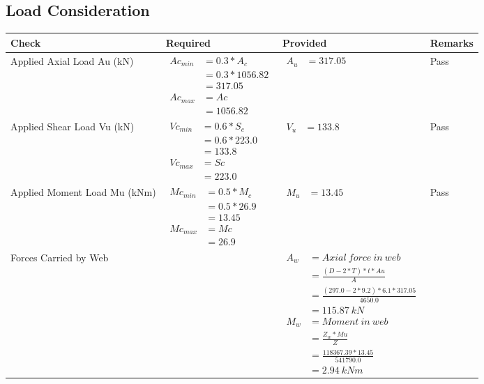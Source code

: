 \documentclass{article}%
\begin{document}
\subsection{Load Consideration}%
\label{subsec:LoadConsideration}%
\renewcommand{\arraystretch}{1.2}%
\begin{longtable}{|p{4cm}|p{3.5cm}|p{6.5cm}|p{1.5cm}|}%
\hline%
\rowcolor{OsdagGreen}%
Check&Required&Provided&Remarks\\%
\hline%
\endhead%
\hline%
Applied Axial Load Au (kN)&$\begin{aligned} Ac_{min} &= 0.3 * A_c\\ &= 0.3 *1056.82\\ &=317.05\\ Ac_{max} &= Ac \\ &=1056.82\end{aligned}$&$\begin{aligned} A_u &=317.05\end{aligned}$&Pass\\%
\hline%
Applied Shear Load Vu (kN)&$\begin{aligned} Vc_{min} &= 0.6 * S_c\\ &= 0.6 *223.0\\ &=133.8\\ Vc_{max} &= Sc \\ &=223.0\end{aligned}$&$\begin{aligned} V_u &=133.8\end{aligned}$&Pass\\%
\hline%
Applied Moment Load Mu (kNm)&$\begin{aligned} Mc_{min} &= 0.5 * M_c\\ &= 0.5 *26.9\\ &=13.45\\  Mc_{max} &= Mc \\ &=26.9\end{aligned}$&$\begin{aligned} M_u &=13.45\end{aligned}$&Pass\\%
\hline%
Forces Carried by Web&&$\begin{aligned}A_w &= Axial~ force~ in~ web  \\   &= \frac{(D- 2*T)*t* Au }{A} \\ &= \frac{(297.0- 2*9.2)*6.1*317.05 }{4650.0} \\ &=115.87~ kN\\ M_w &= Moment ~in ~web  \\  &= \frac{Z_w * Mu}{Z} \\ &= \frac{118367.39 * 13.45}{541790.0} \\ &=2.94~{kNm}\end{aligned}$&\\%

\end{longtable}
\end{document}

